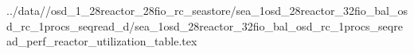 ../data//osd_1_28reactor_28fio_rc_seastore/sea_1osd_28reactor_32fio_bal_osd_rc_1procs_seqread_d/sea_1osd_28reactor_32fio_bal_osd_rc_1procs_seqread_perf_reactor_utilization_table.tex